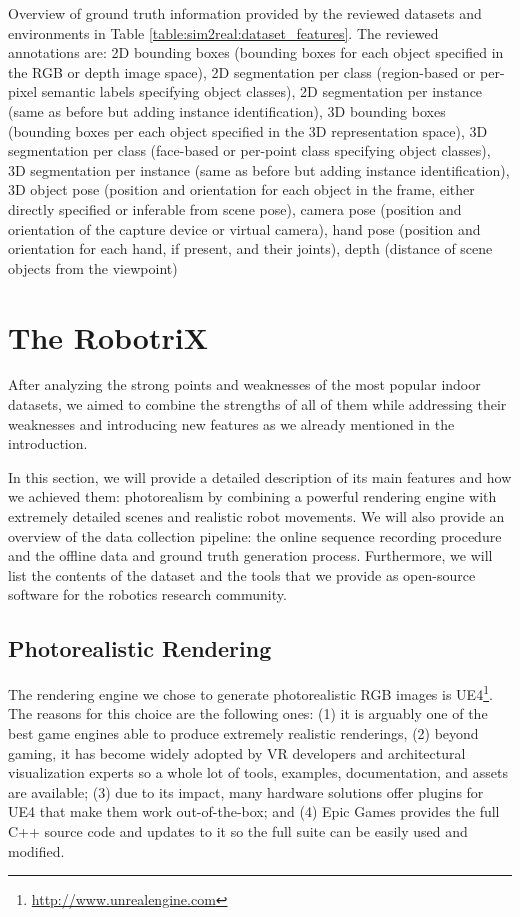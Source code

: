 \begin{table}[!b]
    \caption{Overview of ground truth information provided by the reviewed datasets and environments in Table \ref{table:sim2real:dataset_features}. The reviewed annotations are: 2D bounding boxes (bounding boxes for each object specified in the RGB or depth image space), 2D segmentation per class (region-based or per-pixel semantic labels specifying object classes), 2D segmentation per instance (same as before but adding instance identification), 3D bounding boxes (bounding boxes per each object specified in the 3D representation space), 3D segmentation per class (face-based or per-point class specifying object classes), 3D segmentation per instance (same as before but adding instance identification), 3D object pose (position and orientation for each object in the frame, either directly specified or inferable from scene pose), camera pose (position and orientation of the capture device or virtual camera), hand pose (position and orientation for each hand, if present, and their joints), depth (distance of scene objects from the viewpoint)}
    \label{table:dataset_ground_truth}
  \end{table}

\clearpage

\section{The RobotriX}
\label{cha:sim2real:sec:proposal}

After analyzing the strong points and weaknesses of the most popular indoor datasets, we aimed to combine the strengths of all of them while addressing their weaknesses and introducing new features as we already mentioned in the introduction.

In this section, we will provide a detailed description of its main features and how we achieved them: photorealism by combining a powerful rendering engine with extremely detailed scenes and realistic robot movements. We will also provide an overview of the data collection pipeline: the online sequence recording procedure and the offline data and ground truth generation process. Furthermore, we will list the contents of the dataset and the tools that we provide as open-source software for the robotics research community.

\subsection{Photorealistic Rendering}

The rendering engine we chose to generate photorealistic RGB images is \acf{UE4}\footnote{\url{http://www.unrealengine.com}}. The reasons for this choice are the following ones: (1) it is arguably one of the best game engines able to produce extremely realistic renderings, (2) beyond gaming, it has become widely adopted by VR developers and architectural visualization experts so a whole lot of tools, examples, documentation, and assets are available; (3) due to its impact, many hardware solutions offer plugins for \ac{UE4} that make them work out-of-the-box; and (4) Epic Games provides the full C++ source code and updates to it so the full suite can be easily used and modified.

